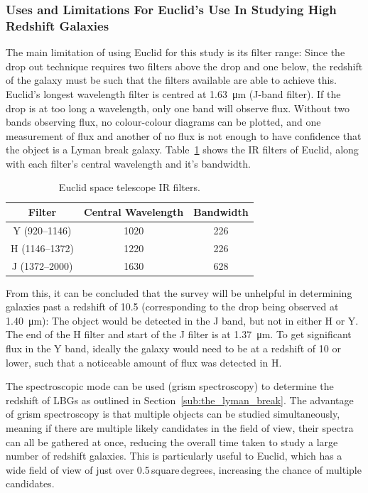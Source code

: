 	\subsubsection{Uses and Limitations For Euclid's Use In Studying High Redshift Galaxies} %
	\label{ssub:uses_and_limitations_for_euclid_s_use_in_studying_high_redshift_galaxies}
		The main limitation of using Euclid for this study is its filter range: Since the drop out technique requires two filters above the drop and one below, the redshift of the galaxy must be such that the filters available are able to achieve this. Euclid's longest wavelength filter is centred at \SI{1.63}{\micro\metre} (J-band filter). If the drop is at too long a wavelength, only one band will observe flux. Without two bands observing flux, no colour-colour diagrams can be plotted, and one measurement of flux and another of no flux is not enough to have confidence that the object is a Lyman break galaxy. Table~\ref{fig:euclid_ir_filters} shows the IR filters of Euclid, along with each filter's central wavelength and it's bandwidth.
		\begin{table}[!htbp]
			\centering
				\begin{tabular}{c|c|c}
					Filter & Central Wavelength & Bandwidth \\
					\hline\hline
					Y (920--1146) & 1020 & 226 \\
					H (1146--1372) & 1220 & 226 \\
					J (1372--2000) & 1630 & 628 \\
				\end{tabular}
				\caption{Euclid space telescope IR filters.\label{fig:euclid_ir_filters}}
		\end{table}

		From this, it can be concluded that the survey will be unhelpful in determining galaxies past a redshift of 10.5 (corresponding to the drop being observed at \SI{1.40}{\micro\metre}): The object would be detected in the J band, but not in either H or Y. The end of the H filter and start of the J filter is at \SI{1.37}{\micro\metre}. To get significant flux in the Y band, ideally the galaxy would need to be at a redshift of 10 or lower, such that a noticeable amount of flux was detected in H.

		The spectroscopic mode can be used (grism spectroscopy) to determine the redshift of LBGs as outlined in Section~\ref{sub:the_lyman_break}. The advantage of grism spectroscopy is that multiple objects can be studied simultaneously, meaning if there are multiple likely candidates in the field of view, their spectra can all be gathered at once, reducing the overall time taken to study a large number of redshift galaxies. This is particularly useful to Euclid, which has a wide field of view of just over 0.5\,square\,degrees, increasing the chance of multiple candidates.

